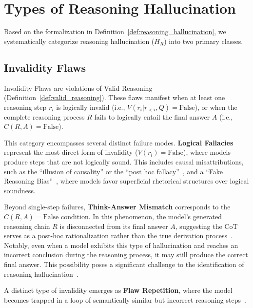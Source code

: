 \vspace{-2mm}\section{Types of Reasoning Hallucination}\vspace{-1mm}
\label{sec:taxonomy}

Based on the formalization in Definition~\ref{def:reasoning_hallucination}, we systematically categorize reasoning hallucination ($H_R$) into two primary classes.

\subsection{Invalidity Flaws}
\label{sec:invalidity_flaws}

Invalidity Flaws are violations of Valid Reasoning (Definition~\ref{def:valid_reasoning}).
These flaws manifest when at least one reasoning step $r_i$ is logically invalid (i.e., $V(r_i | r_{<i}, Q) = \text{False}$), or when the complete reasoning process $R$ fails to logically entail the final answer $A$ (i.e., $C(R, A) = \text{False}$).

This category encompasses several distinct failure modes.
\textbf{Logical Fallacies} represent the most direct form of invalidity ($V(r_i) = \text{False}$), where models produce steps that are not logically sound.
This includes causal misattributions, such as the ``illusion of causality'' or the ``post hoc fallacy''~\cite{joshi2024llms}, and a ``Fake Reasoning Bias''~\cite{wang2025towards}, where models favor superficial rhetorical structures over logical soundness.

Beyond single-step failures, \textbf{Think-Answer Mismatch} corresponds to the $C(R, A) = \text{False}$ condition.
In this phenomenon, the model's generated reasoning chain $R$ is disconnected from its final answer $A$, suggesting the CoT serves as a post-hoc rationalization rather than the true derivation process~\cite{yao2025reasoning}.
Notably, even when a model exhibits this type of hallucination and reaches an incorrect conclusion during the reasoning process, it may still produce the correct final answer.
This possibility poses a significant challenge to the identification of reasoning hallucination~\cite{yee2024dissociation}.

A distinct type of invalidity emerges as \textbf{Flaw Repetition}, where the model becomes trapped in a loop of semantically similar but incorrect reasoning steps~\cite{yao2025reasoning}.

